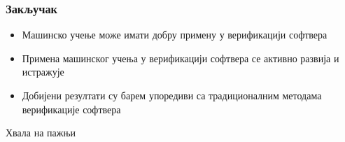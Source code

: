 \documentclass{beamer}
\begin{document}
\begin{frame}
\frametitle{Закључак}
\begin{itemize}
    \item Машинско учење може имати добру примену у верификацији софтвера
    \item Примена машинског учења у верификацији софтвера се активно развија и истражује
    \item Добијени резултати су барем упоредиви са традиционалним методама верификације софтвера
\end{itemize}
\end{frame}
\begin{frame}
\Huge{\centerline{Хвала на пажњи}}
\end{frame}



\end{document}
